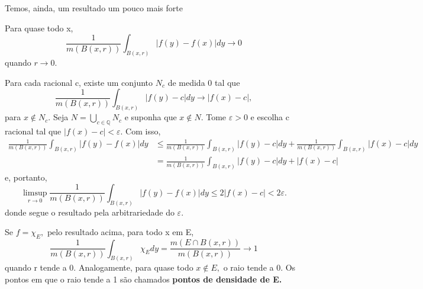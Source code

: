 \documentclass[MeasureTheory/measure_theory.tex]{subfiles}
\begin{document}
Temos, ainda, um resultado um pouco mais forte
\begin{theorem*}
	Para quase todo x,
	\[
		\frac{1}{m(B(x, r))}\int_{B(x, r)}^{}|f(y) - f(x)|dy\to 0
	\]
	quando \(r\to 0\).
\end{theorem*}
\begin{proof*}
	Para cada racional c, existe um conjunto \(N_{c}\) de medida 0 tal que
	\[
		\frac{1}{m(B(x, r))}\int_{B(x, r)}^{}|f(y)-c|dy\to |f(x)-c|,
	\]
	para \(x\not\in N_{c}.\) Seja \(N = \bigcup_{c\in \mathbb{Q}}^{}N_{c}\) e suponha que \(x\not\in N\). Tome \(\varepsilon > 0\) e escolha c racional tal que \(|f(x) - c| < \varepsilon .\)
	Com isso,
	\begin{align*}
		\frac{1}{m(B(x, r))}\int_{B(x, r)}^{}|f(y) - f(x)|dy & \leq \frac{1}{m(B(x, r))}\int_{B(x, r)}^{}|f(y)-c|dy + \frac{1}{m(B(x, r))}\int_{B(x, r)}^{}|f(x)-c|dy \\
		                                                     & = \frac{1}{m(B(x, r))}\int_{B(x, r)}^{}|f(y)-c|dy + |f(x) - c|
	\end{align*}
	e, portanto,
	\[
		\limsup_{r\to 0}\frac{1}{m(B(x, r))}\int_{B(x, r)}^{}|f(y) - f(x)|dy \leq 2|f(x)-c|< 2\varepsilon.
	\]
	donde segue o resultado pela arbitrariedade do \(\varepsilon \). \qedsymbol
\end{proof*}
Se \(f = \chi_{E},\) pelo resultado acima, para todo x em E,
\[
	\frac{1}{m(B(x, r))}\int_{B(x, r)}^{}\chi_{E}dy = \frac{m(E\cap B(x, r))}{m(B(x, r))}\to 1
\]
quando r tende a 0. Analogamente, para quase todo \(x\not\in E,\) o raio tende a 0. Os pontos em que o raio tende a 1 são chamados \textbf{pontos de densidade de E.}
\end{document}
